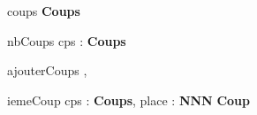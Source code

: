\begin{algorithme}
	\signaturefonction
	{coups}
	{}
	{\textbf{Coups}}
	
	\vspace*{5mm}
	
	\signaturefonction
	{nbCoups}
	{cps : \textbf{Coups}}
	{\naturel}
	
	\vspace*{5mm}
	
	\signatureprocedure
	{ajouterCoups}
	{,}
	
	\vspace*{5mm}
	
	\signaturefonction
	{iemeCoup}
	{cps : \textbf{Coups}, place : \textbf{NNN}}
	{\textbf{Coup}}
	
	
	
\end{algorithme}
